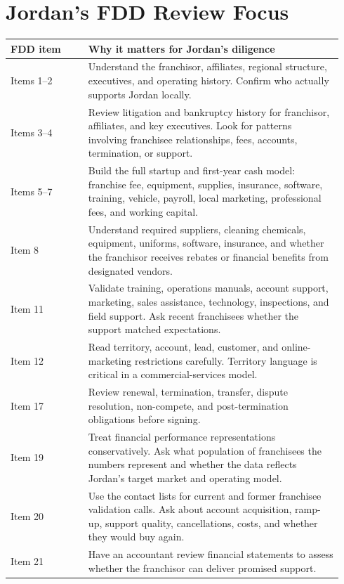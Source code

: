 \documentclass[11pt]{article}
\begin{document}
\section{Jordan's FDD Review Focus}

\begin{longtable}{>{\raggedright\arraybackslash}p{0.22\linewidth}>{\raggedright\arraybackslash}p{0.72\linewidth}}
\toprule
\textbf{FDD item} & \textbf{Why it matters for Jordan's diligence} \\
\midrule
Items 1--2 & Understand the franchisor, affiliates, regional structure, executives, and operating history. Confirm who actually supports Jordan locally. \\
Items 3--4 & Review litigation and bankruptcy history for franchisor, affiliates, and key executives. Look for patterns involving franchisee relationships, fees, accounts, termination, or support. \\
Items 5--7 & Build the full startup and first-year cash model: franchise fee, equipment, supplies, insurance, software, training, vehicle, payroll, local marketing, professional fees, and working capital. \\
Item 8 & Understand required suppliers, cleaning chemicals, equipment, uniforms, software, insurance, and whether the franchisor receives rebates or financial benefits from designated vendors. \\
Item 11 & Validate training, operations manuals, account support, marketing, sales assistance, technology, inspections, and field support. Ask recent franchisees whether the support matched expectations. \\
Item 12 & Read territory, account, lead, customer, and online-marketing restrictions carefully. Territory language is critical in a commercial-services model. \\
Item 17 & Review renewal, termination, transfer, dispute resolution, non-compete, and post-termination obligations before signing. \\
Item 19 & Treat financial performance representations conservatively. Ask what population of franchisees the numbers represent and whether the data reflects Jordan's target market and operating model. \\
Item 20 & Use the contact lists for current and former franchisee validation calls. Ask about account acquisition, ramp-up, support quality, cancellations, costs, and whether they would buy again. \\
Item 21 & Have an accountant review financial statements to assess whether the franchisor can deliver promised support. \\
\bottomrule
\end{longtable}
\end{document}
